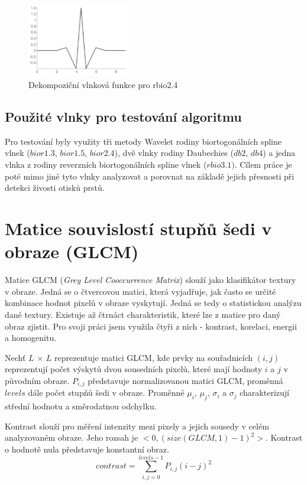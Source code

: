\begin{figure}[!htbp]
    \centering
    \includegraphics[width=170px]{obrazky-figures/rbio31wavelet.PNG}
    \caption{Dekompoziční vlnková funkce pro rbio2.4 \cite{PyWaveletsBrowser}}
\end{figure}

\subsection{Použité vlnky pro testování algoritmu}
Pro testování byly využity tři metody Wavelet rodiny biortogonálních spline vlnek ($bior1.3$, $bior1.5$, $bior2.4$), dvě vlnky rodiny Daubechies ($db2$, $db4$) a jedna vlnka z rodiny reverzních biortogonálních spline vlnek ($rbio3.1)$. Cílem práce je poté mimo jiné tyto vlnky analyzovat a porovnat na základě jejich přesnosti při detekci živosti otisků prstů.


\section{Matice souvislostí stupňů šedi v obraze (GLCM)}
Matice GLCM (\textit{Grey Level Cooccurrence Matrix}) slouží jako klasifikátor textury v obraze. Jedná se o čtvercovou matici, která vyjadřuje, jak často se určité kombinace hodnot pixelů v obraze vyskytují. Jedná se tedy o statistickou analýzu dané textury. Existuje až čtrnáct charakteristik, které lze z matice pro daný obraz zjistit. Pro svoji práci jsem využila čtyři z nich - kontrast, korelaci, energii a homogenitu.

Nechť $L$ $\times$ $L$ reprezentuje matici GLCM, kde prvky na souřadnicích $(i,j)$ reprezentují počet výskytů dvou sousedních pixelů, které mají hodnoty $i$ a $j$ v původním obraze. $P_{i,j}$ představuje normalizovanou matici GLCM, proměnná $levels$ dále počet stupňů šedi v obraze. Proměnné $\mu_i$, $\mu_j$, $\sigma_i$ a $\sigma_j$ charakterizují střední hodnotu a směrodatnou odchylku. \cite{TouchlessANN}

Kontrast slouží pro měření intenzity mezi pixely a jejich sousedy v celém analyzovaném obraze. Jeho rozsah je $<0, (size(GLCM,1)-1)^2>$. Kontrast o hodnotě nula představuje konstantní obraz. \cite{MatlabGLCM} \cite{ScikitGLCM}
$$contrast = \sum_{i,j=0}^{levels-1}P_{i,j}(i-j)^2$$

